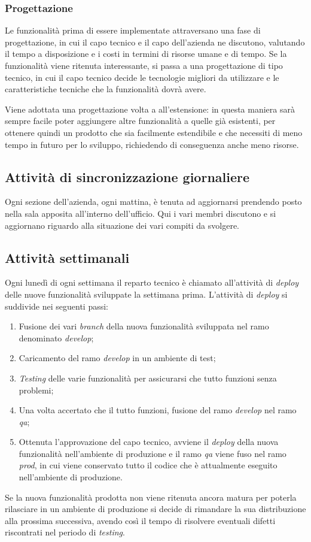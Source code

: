 \subsubsection{Progettazione}
Le funzionalità prima di essere implementate attraversano una fase di
progettazione, in cui il capo tecnico e il capo dell'azienda ne discutono,
valutando il tempo a disposizione e i costi in termini di risorse umane e di
tempo. Se la funzionalità viene ritenuta interessante, si passa a una
progettazione di tipo tecnico, in cui il capo tecnico decide le tecnologie
migliori da utilizzare e le caratteristiche tecniche che la funzionalità dovrà
avere.

Viene adottata una progettazione volta a all'estensione: in questa
maniera sarà sempre facile poter aggiungere altre funzionalità a quelle già
esistenti, per ottenere quindi un prodotto che sia facilmente estendibile e che
necessiti di meno tempo in futuro per lo sviluppo, richiedendo di conseguenza
anche meno risorse.

\subsection{Attività di sincronizzazione giornaliere}

Ogni sezione dell'azienda, ogni mattina, è tenuta ad aggiornarsi prendendo posto
nella sala apposita all'interno dell'ufficio. Qui i vari membri discutono e si
aggiornano riguardo alla situazione dei vari compiti da svolgere.

\subsection{Attività settimanali}
\label{intro:attivitaSettimanali}

Ogni lunedì di ogni settimana il reparto tecnico è chiamato all'attività di
\textit{deploy} delle nuove funzionalità sviluppate la settimana prima.
L'attività di \textit{deploy} si suddivide nei seguenti passi:
\begin{enumerate}

\item Fusione dei vari \textit{branch} della nuova funzionalità sviluppata nel
ramo denominato \textit{develop};
\item Caricamento del ramo \textit{develop} in un ambiente di test;
\item \textit{Testing} delle varie funzionalità per assicurarsi che tutto
funzioni senza problemi;
\item Una volta accertato che il tutto funzioni, fusione del ramo
\textit{develop} nel ramo \textit{qa};
\item Ottenuta l'approvazione del capo tecnico, avviene il \textit{deploy}
della nuova funzionalità nell'ambiente di produzione e il ramo \textit{qa}
viene fuso nel ramo \textit{prod}, in cui viene conservato tutto il codice che
è attualmente eseguito nell'ambiente di produzione.
\end{enumerate}

Se la nuova funzionalità prodotta non viene ritenuta ancora matura per poterla
rilasciare in un ambiente di produzione si decide di rimandare la sua
distribuzione alla prossima successiva, avendo così il tempo di risolvere
eventuali difetti riscontrati nel periodo di \textit{testing}.
